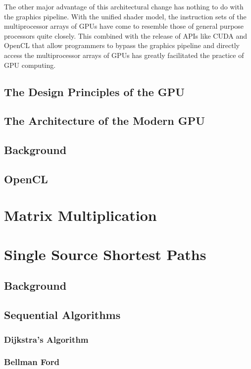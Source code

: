 \documentclass[12pt,twoside]{reedthesis}
\begin{document}
The other major advantage of this architectural change has nothing to do with the graphics pipeline. With the unified shader model, the instruction sets of the multiprocessor arrays of GPUs have come to resemble those of general purpose processors quite closely. This combined with the release of APIs like CUDA and OpenCL that allow programmers to bypass the graphics pipeline and directly access the multiprocessor arrays of GPUs has greatly facilitated the practice of GPU computing.

\section{The Design Principles of the GPU}

\section{The Architecture of the Modern GPU}







\section{Background}
\section{OpenCL}

\chapter{Matrix Multiplication}
\chapter{Single Source Shortest Paths}
\section{Background}
\section{Sequential Algorithms}
\subsection{Dijkstra's Algorithm}
\subsection{Bellman Ford}
\end{document}
